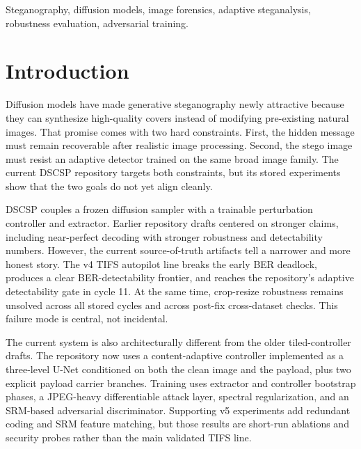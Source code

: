 \documentclass[journal]{IEEEtran}
\begin{document}
\begin{IEEEkeywords}
Steganography, diffusion models, image forensics, adaptive steganalysis, robustness evaluation, adversarial training.
\end{IEEEkeywords}

\section{Introduction}
Diffusion models \cite{ho2020denoising} have made generative steganography newly attractive because they can synthesize high-quality covers instead of modifying pre-existing natural images. That promise comes with two hard constraints. First, the hidden message must remain recoverable after realistic image processing. Second, the stego image must resist an adaptive detector trained on the same broad image family. The current DSCSP repository targets both constraints, but its stored experiments show that the two goals do not yet align cleanly.

DSCSP couples a frozen diffusion sampler with a trainable perturbation controller and extractor. Earlier repository drafts centered on stronger claims, including near-perfect decoding with stronger robustness and detectability numbers. However, the current source-of-truth artifacts tell a narrower and more honest story. The v4 TIFS autopilot line breaks the early BER deadlock, produces a clear BER-detectability frontier, and reaches the repository's adaptive detectability gate in cycle 11. At the same time, crop-resize robustness remains unsolved across all stored cycles and across post-fix cross-dataset checks. This failure mode is central, not incidental.

The current system is also architecturally different from the older tiled-controller drafts. The repository now uses a content-adaptive controller implemented as a three-level U-Net conditioned on both the clean image and the payload, plus two explicit payload carrier branches. Training uses extractor and controller bootstrap phases, a JPEG-heavy differentiable attack layer, spectral regularization, and an SRM-based adversarial discriminator. Supporting v5 experiments add redundant coding and SRM feature matching, but those results are short-run ablations and security probes rather than the main validated TIFS line.
\end{document}
